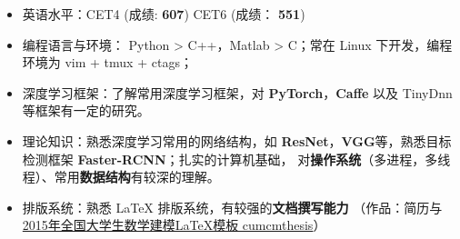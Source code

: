 \documentclass[paper=a4,fontsize=11pt,svgnames]{temp} %
\begin{document}
\noindent
\vspace*{-.9cm}
\hspace*{0cm}
\begin{minipage}{.96\textwidth}
\begin{itemize}
	\item 英语水平：CET4 (成绩: \textbf{607}) \hspace*{1cm} CET6 (成绩： \textbf{551})
	\item 编程语言与环境： Python > C++，Matlab > C；常在 Linux 下开发，编程环境为 vim + tmux + ctags；
	\item 深度学习框架：了解常用深度学习框架，对 \textbf{PyTorch}，\textbf{Caffe} 以及 TinyDnn 等框架有一定的研究。
	\item 理论知识：熟悉深度学习常用的网络结构，如 \textbf{ResNet}，\textbf{VGG}等，熟悉目标检测框架 \textbf{Faster-RCNN}；扎实的计算机基础，
	对\textbf{操作系统}（多进程，多线程）、常用\textbf{数据结构}有较深的理解。
	\item 排版系统：熟悉 \LaTeX{} 排版系统，有较强的\textbf{文档撰写能力} （作品：简历与
	\href{http://www.latexstudio.net/archives/4200}{2015年全国大学生数学建模LaTeX模板 cumcmthesis}）
\end{itemize}
\end{minipage}

\end{document}
